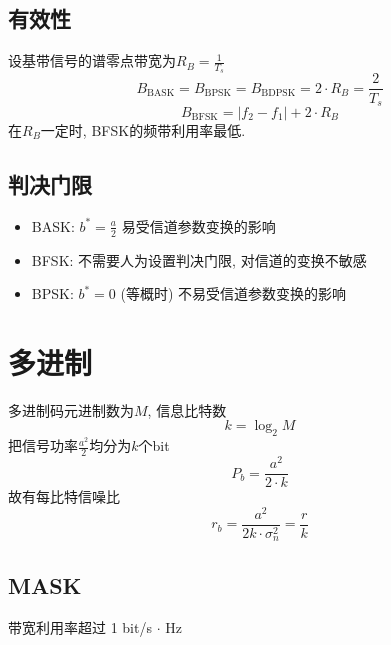 \documentclass[a4paper]{report}
\begin{document}
\subsection{有效性}
设基带信号的谱零点带宽为$R_B=\frac{1}{T_s}$
\begin{equation}
  B_{\text{BASK}}=B_{\text{BPSK}}=B_{\text{BDPSK}}=2\cdot R_B=\frac{2}{T_s}
\end{equation}
\begin{equation}
  B_{\text{BFSK}}=\lvert f_2 -f_1\rvert+2\cdot R_B
\end{equation}
在$R_B$一定时, BFSK的频带利用率最低. 
\subsection{判决门限}
\begin{itemize}
  \item BASK: $b^*=\frac{a}{2}$ 易受信道参数变换的影响
  \item BFSK: 不需要人为设置判决门限, 对信道的变换不敏感
  \item BPSK: $b^*=0$ (等概时) 不易受信道参数变换的影响
\end{itemize}



\section{多进制}
多进制码元进制数为$M$, 
信息比特数\begin{equation}
  k=\log_2{M}
\end{equation}
把信号功率$\frac{a^2}{2}$均分为$k$个bit
\begin{equation}
  P_b=\frac{a^2}{2\cdot k}
\end{equation}
故有每比特信噪比
\begin{equation}
  r_b=\frac{a^2}{2k\cdot \sigma^2_n}=\frac{r}{k}
\end{equation}
\subsection{MASK}
带宽利用率超过 1 bit/s $\cdot$ Hz
\end{document}

